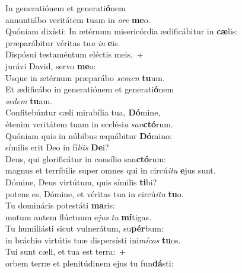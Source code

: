 \evenverse In generatiónem et generati\textbf{ó}nem~\*\\
\evenverse annuntiábo veritátem tuam in \textit{o}\textit{re} \textbf{me}o.\\
\oddverse Quóniam dixísti: In ætérnum misericórdia ædificábitur in \textbf{cæ}lis:~\*\\
\oddverse præparábitur véritas tu\textit{a} \textit{in} \textbf{e}is.\\
\evenverse Dispósui testaméntum eléctis meis,~+\\
\evenverse  jurávi David, servo \textbf{me}o:~\*\\
\evenverse Usque in ætérnum præparábo \textit{se}\textit{men} \textbf{tu}um.\\
\oddverse Et ædificábo in generatiónem et generati\textbf{ó}nem~\*\\
\oddverse \textit{se}\textit{dem} \textbf{tu}am.\\
\evenverse Confitebúntur cæli mirabília tua, \textbf{Dó}mine,~\*\\
\evenverse étenim veritátem tuam in ecclési\textit{a} \textit{san}\textbf{ctó}rum.\\
\oddverse Quóniam quis in núbibus æquábitur \textbf{Dó}mino:~\*\\
\oddverse símilis erit Deo in fí\textit{li}\textit{is} \textbf{De}i?\\
\evenverse Deus, qui glorificátur in consílio san\textbf{ctó}rum:~\*\\
\evenverse magnus et terríbilis super omnes qui in circú\textit{i}\textit{tu} \textbf{e}jus sunt.\\
\oddverse Dómine, Deus virtútum, quis símilis \textbf{ti}bi?~\*\\
\oddverse potens es, Dómine, et véritas tua in circú\textit{i}\textit{tu} \textbf{tu}o.\\
\evenverse Tu domináris potestáti \textbf{ma}ris:~\*\\
\evenverse motum autem flúctuum e\textit{jus} \textit{tu} \textbf{mí}tigas.\\
\oddverse Tu humiliásti sicut vulnerátum, su\textbf{pér}bum:~\*\\
\oddverse in bráchio virtútis tuæ dispersísti ini\textit{mí}\textit{cos} \textbf{tu}os.\\
\evenverse Tui sunt cæli, et tua est terra:~+\\
\evenverse  orbem terræ et plenitúdinem ejus tu fun\textbf{dá}sti:~\*\\
